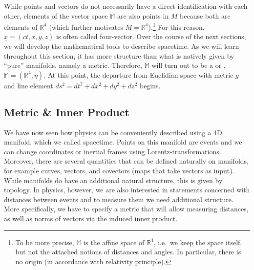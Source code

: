 While points and vectors do not necessarily have a direct identification with each other, elements of the vector space $\mathbb{M}$ are also points in $M$ because both are elements of $\mathbb{R}^4$ (which further motivates $M = \mathbb{R}^4$).\footnote{To be more precise, $\mathbb{M}$ is the affine space of $\mathbb{R}^4$, i.e.~we keep the space itself, but not the attached notions of distances and angles. In particular, there is no origin (in accordance with relativity principle).} For this reason, $\underline{x} = (ct, x, y, z)$ is often called four-vector. Over the course of the next sections, we will develop the mathematical tools to describe spacetime. As we will learn throughout this section, it has more structure than what is natively given by \enquote{pure} manifolds, namely a metric. Therefore, $\mathbb{M}$ will turn out to be a  or , $\mathbb{M} = (\mathbb{R}^4, \eta)$. At this point, the departure from Euclidian space with metric $g$ and line element $ds^2 = dt^2 + dx^2 + dy^2 + dz^2$ begins.






		\subsection{Metric \& Inner Product}
We have now seen how physics can be conveniently described using a 4D manifold, which we called spacetime. Points on this manifold are events and we can change coordinates or inertial frames using Lorentz-transformations. Moreover, there are several quantities that can be defined naturally on manifolds, for example curves, vectors, and covectors (maps that take vectors as input). While manifolds do have an additional natural structure, this is given by topology. In physics, however, we are also interested in statements concerned with distances between events and to measure them we need additional structure. More specifically, we have to specify a metric that will allow measuring distances, as well as norms of vectors via the induced inner product.


